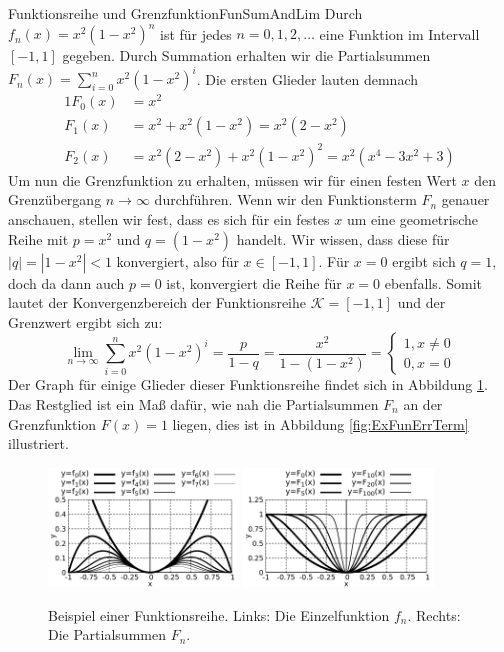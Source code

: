 \begin{example}{Funktionsreihe und Grenzfunktion}{FunSumAndLim}
    Durch $f_{n}(x) = x^2 (1-x^2)^n$ ist für jedes $n=0,1,2,\dots$ eine Funktion im Intervall $[-1,1]$ gegeben. Durch Summation erhalten wir die Partialsummen $F_n(x) = \sum\limits_{i=0}^n x^2 (1-x^2)^i$. Die ersten Glieder lauten demnach
    \begin{alignat*}{1}
        F_0(x) &= x^2 \\
        F_1(x) &= x^2 + x^2 (1-x^2) = x^2 (2-x^2) \\
        F_2(x) &= x^2 (2-x^2) + x^2 (1-x^2)^2 = x^2 (x^4-3x^2+3)
    \end{alignat*}
    Um nun die Grenzfunktion zu erhalten, müssen wir für einen festen Wert $x$ den Grenzübergang $n \to \infty$ durchführen. Wenn wir den Funktionsterm $F_n$ genauer anschauen, stellen wir fest, dass es sich für ein festes $x$ um eine geometrische Reihe mit $p=x^2$ und $q=(1-x^2)$ handelt. Wir wissen, dass diese für $|q|=|1-x^2|<1$ konvergiert, also für $x \in [-1,1]$. Für $x=0$ ergibt sich $q=1$, doch da dann auch $p=0$ ist, konvergiert die Reihe für $x=0$ ebenfalls. Somit lautet der Konvergenzbereich der Funktionsreihe $\mathcal{K} = [-1,1]$ und der Grenzwert ergibt sich zu:
    $$
        \lim\limits_{n\to\infty} \sum\limits_{i=0}^n x^2 (1-x^2)^i = \frac{p}{1-q} = \frac{x^2}{1-(1-x^2)} = \begin{cases}
          1, x \ne 0 \\ 0, x = 0
        \end{cases}
    $$
    Der Graph für einige Glieder dieser Funktionsreihe findet sich in Abbildung \ref{fig:ExFunSum}. Das Restglied ist ein Maß dafür, wie nah die Partialsummen $F_n$ an der Grenzfunktion $F(x) = 1$ liegen, dies ist in Abbildung \ref{fig:ExFunErrTerm} illustriert.
\end{example}

\begin{figure}
    \centering
    \includegraphics[width=0.45\textwidth]{./gnuplot/example-function-sum}
    \includegraphics[width=0.45\textwidth]{./gnuplot/example-function-sum-summed}
    \caption[Einzelfunktionen und Partialsummen einer Funktionsreihe]{Beispiel einer Funktionsreihe. Links: Die Einzelfunktion $f_n$. Rechts: Die Partialsummen $F_n$.}
    \label{fig:ExFunSum}
\end{figure}

